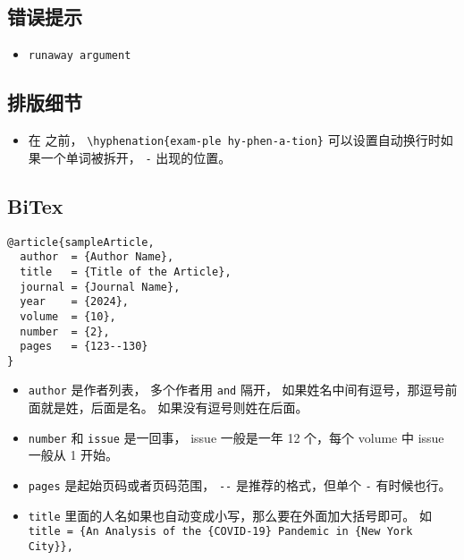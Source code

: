 
\begin{issues}
\issueDraft
\end{issues}

\subsection{错误提示}
\begin{itemize}
\item \verb`runaway argument`
\end{itemize}


\subsection{排版细节}
\begin{itemize}
\item 在 \verb`` 之前， \verb`\hyphenation{exam-ple hy-phen-a-tion}` 可以设置自动换行时如果一个单词被拆开， \verb`-` 出现的位置。
\end{itemize}

\subsection{BiTex}

\begin{lstlisting}[language=none, caption=BibTeX 的例子]
@article{sampleArticle,
  author  = {Author Name},
  title   = {Title of the Article},
  journal = {Journal Name},
  year    = {2024},
  volume  = {10},
  number  = {2},
  pages   = {123--130}
}
\end{lstlisting}

\begin{itemize}
\item \verb`author` 是作者列表， 多个作者用 \verb`and` 隔开， 如果姓名中间有逗号，那逗号前面就是姓，后面是名。 如果没有逗号则姓在后面。
\item \verb`number` 和 \verb`issue` 是一回事， issue 一般是一年 12 个，每个 volume 中 issue 一般从 1 开始。
\item \verb`pages` 是起始页码或者页码范围， \verb`--` 是推荐的格式，但单个 \verb`-` 有时候也行。
\item \verb`title` 里面的人名如果也自动变成小写，那么要在外面加大括号即可。 如 \verb`title = {An Analysis of the {COVID-19} Pandemic in {New York City}},`
\end{itemize}
